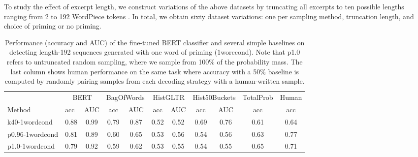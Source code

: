 To study the effect of excerpt length, we construct variations of the above datasets by truncating all excerpts to ten possible lengths ranging from 2 to 192 WordPiece tokens \cite{wu2016google}. In total, we obtain sixty dataset variations: one per sampling method, truncation length, and choice of priming or no priming.


\begin{table}[t]
  \centering
  \small
    \begin{tabular}{|l||cc||cc|cc|cc|c||c|}
    \hline
          & \multicolumn{2}{c||}{BERT} & \multicolumn{2}{c|}{BagOfWords} & \multicolumn{2}{c|}{HistGLTR} & \multicolumn{2}{c|}{Hist50Buckets} & \multicolumn{1}{l||}{TotalProb} & \multicolumn{1}{l|}{Human} \\
    Method & \multicolumn{1}{l}{acc} & \multicolumn{1}{c||}{AUC} & \multicolumn{1}{c}{acc} & \multicolumn{1}{c|}{AUC} & \multicolumn{1}{c}{acc} & \multicolumn{1}{c|}{AUC} & \multicolumn{1}{c}{acc} & \multicolumn{1}{c|}{AUC} & \multicolumn{1}{c||}{acc} & \multicolumn{1}{c|}{acc}\\
    \hline
    k40-1wordcond & 0.88  & 0.99  & 0.79  & 0.87  & 0.52  & 0.52  & 0.69  & 0.76  & 0.61 & 0.64 \\
    p0.96-1wordcond & 0.81  & 0.89  & 0.60  & 0.65  & 0.53  & 0.56  & 0.54  & 0.56  & 0.63 & 0.77 \\
    p1.0-1wordcond & 0.79  & 0.92  & 0.59  & 0.62  & 0.53  & 0.55  & 0.54  & 0.55  & 0.65 & 0.71\\
    \hline
    \end{tabular}%
  \caption{Performance (accuracy and AUC) of the fine-tuned BERT classifier and several simple baselines on detecting length-192 sequences generated with one word of priming (1worccond). Note that p1.0 refers to untruncated random sampling, where we sample from 100\% of the probability mass. The last column shows human performance on the same task where accuracy with a 50\% baseline is computed by randomly pairing samples from each decoding strategy with a human-written sample.}
  \label{tab:baselines}%
\end{table}%

